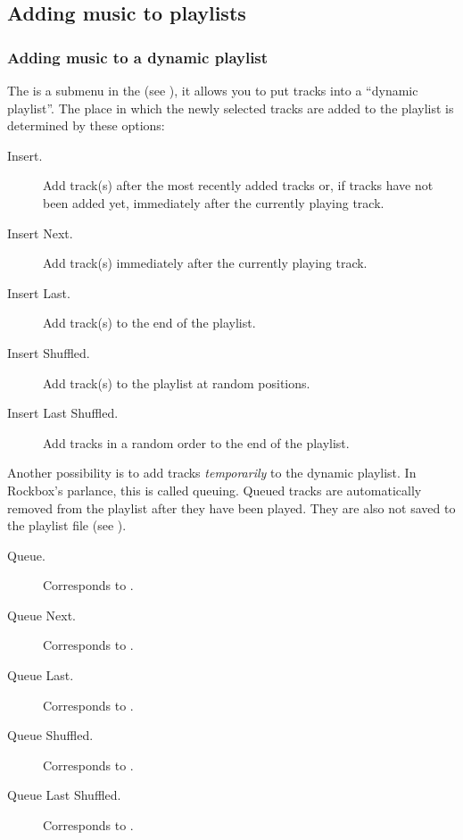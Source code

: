 \subsection{Adding music to playlists}

\subsubsection{\label{ref:currentplaylist_submenu}Adding music to a dynamic playlist}
The  is a submenu in the  (see
), it allows you to put tracks into a
``dynamic playlist''. The place in which the newly
selected tracks are added to the playlist is determined by these
options:

\begin{description}
\item [Insert.] Add track(s) after the most recently added tracks or, if tracks
have not been added yet, immediately after the currently playing track.

\item [Insert Next.] Add track(s) immediately after the currently playing track.

\item [Insert Last.] Add track(s) to the end of the playlist.

\item [Insert Shuffled.] Add track(s) to the playlist at random positions.

\item [Insert Last Shuffled.] Add tracks in a random order to the end of the playlist.
\end{description}

Another possibility is to add tracks \emph{temporarily} to the dynamic playlist.
In Rockbox’s parlance, this is called queuing. Queued tracks are automatically
removed from the playlist after they have been played. They are also not saved
to the playlist file (see ).

\begin{description}
\item [Queue.] Corresponds to .

\item [Queue Next.] Corresponds to .

\item [Queue Last.] Corresponds to .

\item [Queue Shuffled.] Corresponds to .

\item [Queue Last Shuffled.] Corresponds to .
\end{description}

